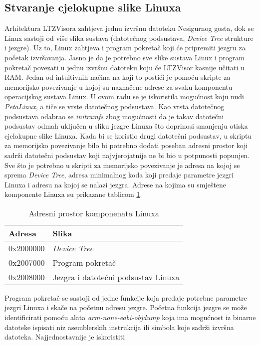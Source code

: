 \documentclass[times, utf8, diplomski, numeric]{fer}
\begin{document}
\subsection{Stvaranje cjelokupne slike Linuxa}
Arhitektura LTZVisora zahtjeva jednu izvršnu datoteku Nesigurnog gosta, dok se Linux sastoji od više slika sustava (datotečnog
podsustava, \textit{Device Tree} strukture i jezgre). Uz to, Linux zahtjeva i program pokretač koji će pripremiti jezgru za
početak izvršavanja. Jasno je da je potrebno sve slike sustava Linux i program pokretač povezati u jednu izvršnu datoteku
koju će LTZVisor kasnije učitati u RAM. Jedan od intuitivnih načina na koji to postići je pomoću skripte za memorijsko
povezivanje u kojoj su naznačene adrese za svaku komponentu operacijskog sustava Linux. U ovom radu se je iskoristila mogućnost
koju nudi \textit{PetaLinux}, a tiče se vrste datotečnog podsustava. Kao vrsta datotečnog podsustava odabrao se
\textit{initramfs} zbog mogućnosti da je takav datotečni podsustav odmah uključen u sliku jezgre Linuxa što doprinosi smanjenju
otiska cjelokupne slike Linuxa. Kada bi se koristio drugi datotečni podsustav, u skriptu za memorijsko povezivanje bilo bi
potrebno dodati poseban adresni prostor koji sadrži datotečni podsustav koji najvjerojatnije ne bi bio u potpunosti popunjen.
Sve što je potrebno u skripti za memorijsko povezivanje je adresa na kojoj se sprema \textit{Device Tree}, adresa minimalnog
koda koji predaje parametre jezgri Linuxa i adresu na kojoj se nalazi jezgra. Adrese na kojima su smještene komponente Linuxa
su prikazane tablicom \ref{adr_space}.
\begin{table}[H]
  \centering
  \begin{tabular}{ | p{3cm} | p{6cm} |}
    \hline
    \textbf{Adresa} & \textbf{Slika}\\
    \hline
    0x2000000 & \textit{Device Tree}\\
    \hline
    0x2007000 & Program pokretač\\
    \hline
    0x2008000 & Jezgra i datotečni podsustav  Linuxa\\
    \hline
  \end{tabular}
  \caption{Adresni prostor komponenata Linuxa}
  \label{adr_space}
\end{table}
Program pokretač se sastoji od jedne funkcije koja predaje potrebne parametre jezgri Linuxa i skače na početnu adresu jezgre.
Početna funkcija jezgre se može identificirati pomoću alata \textit{arm-none-eabi-objdump} koja ima mogućnost iz binarne
datoteke ispisati niz asemblerskih instrukcija ili simbola koje sadrži izvršna datoteka. Najjednostavnije je iskoristiti
\end{document}
